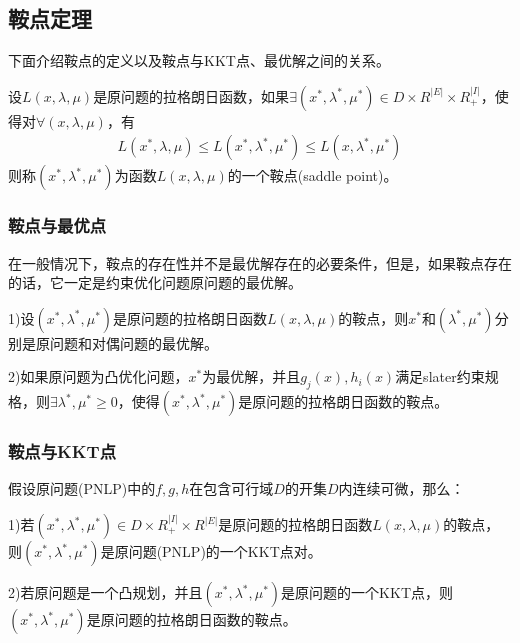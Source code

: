     \subsection{鞍点定理}
        \par
        下面介绍鞍点的定义以及鞍点与KKT点、最优解之间的关系。
        \begin{definition}[鞍点]
        \par
        设$L(x,\lambda,\mu)$是原问题的拉格朗日函数，如果$\exists (x^*,{\lambda}^*,{\mu}^*)\in D\times R^{|E|}\times R_+^{|I|}$，使得对$\forall(x,\lambda,\mu)$，有
        \begin{align*}
        L(x^*,{\lambda},{\mu}) \leqslant L(x^*,{\lambda}^*,{\mu}^*) \leqslant L(x,{\lambda}^*,{\mu}^*)
        \end{align*}
        则称$(x^*,{\lambda}^*,{\mu}^*)$为函数$L(x,\lambda,\mu)$的一个鞍点(saddle point)。
        \end{definition}
        \subsubsection{鞍点与最优点}
            \par
            在一般情况下，鞍点的存在性并不是最优解存在的必要条件，但是，如果鞍点存在的话，它一定是约束优化问题原问题的最优解。
            \par
            1)设$(x^*,{\lambda}^*,{\mu}^*)$是原问题的拉格朗日函数$L(x,\lambda,\mu)$的鞍点，则$x^*$和$({\lambda}^*,{\mu}^*)$分别是原问题和对偶问题的最优解。
            \par
            2)如果原问题为凸优化问题，$x^*$为最优解，并且$g_j(x),h_i(x)$满足slater约束规格，则$\exists {\lambda}^* ,{\mu}^*\geqslant 0$，使得$(x^*,{\lambda}^*,{\mu}^*)$是原问题的拉格朗日函数的鞍点。
        \subsubsection{鞍点与KKT点}
            \par
            假设原问题(PNLP)中的$f,g,h$在包含可行域$D$的开集$D$内连续可微，那么：
            \par
            1)若$(x^*,{\lambda}^*,{\mu}^*)\in D\times R_+^{|I|}\times R^{|E|}$是原问题的拉格朗日函数$L(x,\lambda,\mu)$的鞍点，则$(x^*,{\lambda}^*,{\mu}^*)$是原问题(PNLP)的一个KKT点对。
            \par
            2)若原问题是一个凸规划，并且$(x^*,{\lambda}^*,{\mu}^*)$是原问题的一个KKT点，则$(x^*,{\lambda}^*,{\mu}^*)$是原问题的拉格朗日函数的鞍点。

